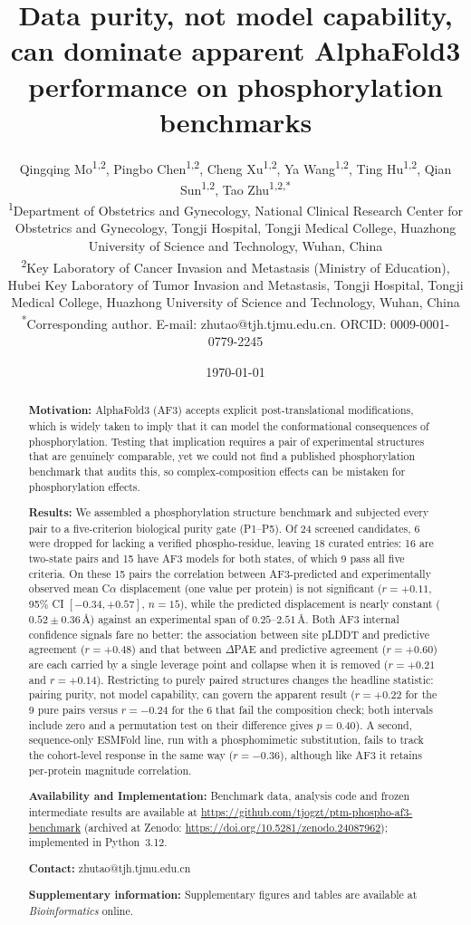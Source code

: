 \documentclass[11pt]{article}
\title{\textbf{Data purity, not model capability, can dominate apparent
AlphaFold3 performance on phosphorylation benchmarks}}
\author{%
\parbox{0.92\textwidth}{\centering
Qingqing Mo\textsuperscript{1,2},
Pingbo Chen\textsuperscript{1,2},
Cheng Xu\textsuperscript{1,2},
Ya Wang\textsuperscript{1,2},
Ting Hu\textsuperscript{1,2},
Qian Sun\textsuperscript{1,2},
Tao Zhu\textsuperscript{1,2,*}\\[4pt]
\small \textsuperscript{1}Department of Obstetrics and Gynecology, National Clinical Research Center for Obstetrics and Gynecology, Tongji Hospital, Tongji Medical College, Huazhong University of Science and Technology, Wuhan, China\\
\small \textsuperscript{2}Key Laboratory of Cancer Invasion and Metastasis (Ministry of Education), Hubei Key Laboratory of Tumor Invasion and Metastasis, Tongji Hospital, Tongji Medical College, Huazhong University of Science and Technology, Wuhan, China\\[4pt]
\small \textsuperscript{*}Corresponding author. E-mail: zhutao@tjh.tjmu.edu.cn. ORCID: 0009-0001-0779-2245}%
}
\date{\today}
\begin{document}
\maketitle

\begin{abstract}
\noindent
\textbf{Motivation:} AlphaFold3 (AF3) accepts explicit post-translational
modifications, which is widely taken to imply that it can model the
conformational consequences of phosphorylation. Testing that implication
requires a pair of experimental structures that are genuinely comparable,
yet we could not find a published phosphorylation benchmark that audits
this, so complex-composition effects can be mistaken for phosphorylation
effects.

\noindent
\textbf{Results:} We assembled a phosphorylation structure benchmark and
subjected every pair to a five-criterion biological purity gate
(P1--P5). Of 24 screened candidates, 6 were dropped for lacking a verified
phospho-residue, leaving 18 curated entries: 16 are two-state pairs and 15
have AF3 models for both states, of which 9 pass all five criteria. On
these 15 pairs the correlation between AF3-predicted and experimentally
observed mean C$\alpha$ displacement (one value per protein) is not
significant ($r=+0.11$, 95\% CI
$[-0.34,+0.57]$, $n=15$), while the predicted displacement is nearly
constant ($0.52\pm0.36$\,\AA) against an experimental span of
$0.25$--$2.51$\,\AA. Both AF3 internal confidence signals fare no better:
the association between site pLDDT and predictive agreement
($r=+0.48$) and that between $\Delta$PAE and predictive agreement
($r=+0.60$) are each carried by a single leverage point and collapse when
it is removed ($r=+0.21$ and $r=+0.14$). Restricting to purely paired
structures changes the headline statistic: pairing purity, not model
capability, can govern the apparent result ($r=+0.22$ for the 9
pure pairs versus $r=-0.24$ for the 6 that fail the
composition check; both intervals include zero and a permutation test on
their difference gives $p=0.40$). A second,
sequence-only ESMFold line, run with a phosphomimetic substitution, fails
to track the cohort-level response in the same way ($r=-0.36$), although
like AF3 it retains per-protein magnitude correlation.

\noindent
\textbf{Availability and Implementation:} Benchmark data, analysis code
and frozen intermediate results are available at
\url{https://github.com/tjogzt/ptm-phospho-af3-benchmark}
(archived at Zenodo: \url{https://doi.org/10.5281/zenodo.24087962});
implemented in Python~3.12.

\noindent
\textbf{Contact:} zhutao@tjh.tjmu.edu.cn

\noindent
\textbf{Supplementary information:} Supplementary figures and tables are
available at \textit{Bioinformatics} online.
\end{abstract}
\end{document}
